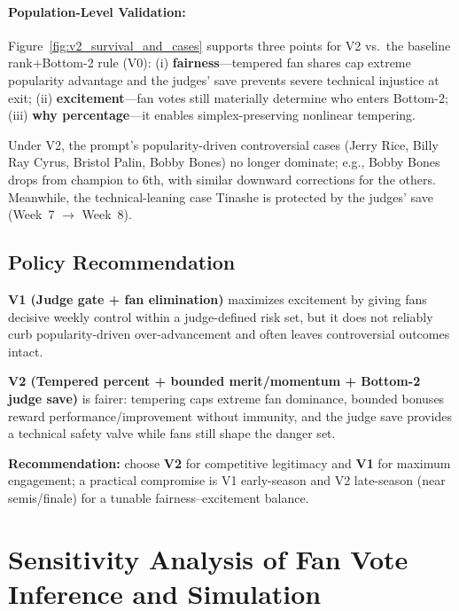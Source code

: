 \documentclass[12pt]{article}
\begin{document}
\paragraph{Population-Level Validation:}
Figure~\ref{fig:v2_survival_and_cases} supports three points for V2 vs.\ the baseline rank+Bottom-2 rule (V0): (i) \textbf{fairness}---tempered fan shares cap extreme popularity advantage and the judges’ save prevents severe technical injustice at exit; (ii) \textbf{excitement}---fan votes still materially determine who enters Bottom-2; (iii) \textbf{why percentage}---it enables simplex-preserving nonlinear tempering.

Under V2, the prompt’s popularity-driven controversial cases (Jerry Rice, Billy Ray Cyrus, Bristol Palin, Bobby Bones) no longer dominate; e.g., Bobby Bones drops from champion to $6$th, with similar downward corrections for the others. Meanwhile, the technical-leaning case Tinashe is protected by the judges’ save (Week~7 $\rightarrow$ Week~8).


\subsection{Policy Recommendation}
\textbf{V1 (Judge gate + fan elimination)} maximizes excitement by giving fans decisive weekly control within a judge-defined risk set, but it does not reliably curb popularity-driven over-advancement and often leaves controversial outcomes intact.

\textbf{V2 (Tempered percent + bounded merit/momentum + Bottom-2 judge save)} is fairer: tempering caps extreme fan dominance, bounded bonuses reward performance/improvement without immunity, and the judge save provides a technical safety valve while fans still shape the danger set.

\textbf{Recommendation:} choose \textbf{V2} for competitive legitimacy and \textbf{V1} for maximum engagement; a practical compromise is V1 early-season and V2 late-season (near semis/finale) for a tunable fairness--excitement balance.








\section{Sensitivity Analysis of Fan Vote Inference and Simulation}
\end{document}

